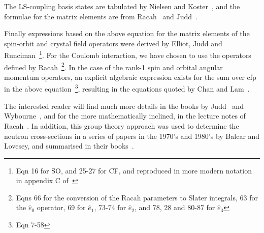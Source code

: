 The LS-coupling basis states are tabulated by Nielsen and Koster~\cite{nielson63-1}, and the
formulae for the matrix elements are from Racah~\cite{racah42-186,racah42-438,racah43-367}
 and Judd~\cite{judd88-1}.



Finally expressions based on the above equation for the matrix elements of the spin-orbit and
crystal field operators were derived by Elliot, Judd and Runciman~\cite{elliot57-509}\footnote{Eqn
16 for SO, and 25-27 for CF, and reproduced in more modern notation in appendix C
of~\cite{ducle09-1}}. For the Coulomb interaction, we have chosen to use the operators defined by
Racah~\cite{racah49-1352}\footnote{Eqns 66 for the conversion of the Racah parameters to Slater
integrals, 63 for the $\hat e_0$ operator, 69 for $\hat e_1$, 73-74 for $\hat e_2$, and 78, 28 and 80-87 for
$\hat e_3$}. In the case of the rank-1 spin and orbital angular momentum operators, an explicit algebraic
expression exists for the sum over cfp in the above equation~\cite{judd88-1}\footnote{Eqn 7-58},
resulting in the equations quoted by Chan and Lam~\cite{chan70-219}.

The interested reader will find much more details in the books by Judd~\cite{judd88-1} and
Wybourne~\cite{wybourne65}, and for the more mathematically inclined, in the lecture notes of
Racah~\cite{racah51}. In addition, this group theory approach was used to determine the neutron
cross-sections in a series of papers in the 1970's and 1980's by Balcar and Lovesey, and summarised
in their books~\cite{lovesey84-1,balcar89-1}.

